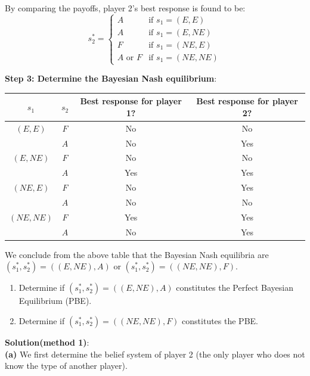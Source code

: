 \documentclass[twoside]{article}
\theoremstyle{definitionstyle}
\begin{document}
By comparing the payoffs, player 2's best response is found to be:
$$s_2^* = \begin{cases}
A & \text{if } s_1 = (E, E) \\
A & \text{if } s_1 = (E, NE) \\
F & \text{if } s_1 = (NE, E) \\
A \text{ or } F & \text{if } s_1 = (NE, NE)
\end{cases}$$

\textbf{Step 3: Determine the Bayesian Nash equilibrium}:\\
\begin{center}
\begin{tabular}{cc|cc}
    $s_1$ & $s_2$ & Best response for player 1? & Best response for player 2? \\ \hline
    $(E, E)$ & $F$ & No & No \\
             & $A$ & No & Yes \\ \hline
    $(E, NE)$ & $F$ & No & No \\
              & $A$ & Yes & Yes \\ \hline
    $(NE, E)$ & $F$ & No & Yes \\
              & $A$ & No & No \\ \hline
    $(NE, NE)$ & $F$ & Yes & Yes \\
               & $A$ & No & Yes
\end{tabular}
\end{center}

We conclude from the above table that the Bayesian Nash equilibria are $(s_1^*, s_2^*) = ((E, NE), A)$ or $(s_1^*, s_2^*) = ((NE, NE), F)$.

\begin{enumerate}
    \item[(a)] Determine if $(s_1^*, s_2^*) = ((E, NE), A)$ constitutes the Perfect Bayesian Equilibrium (PBE).
    \item[(b)] Determine if $(s_1^*, s_2^*) = ((NE, NE), F)$ constitutes the PBE.
\end{enumerate}

\textbf{Solution(method 1)}:\\
\textbf{(a)} We first determine the belief system of player 2 (the only player who does not know the type of another player).
\end{document}
